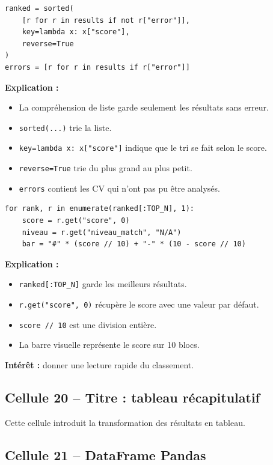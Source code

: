 \documentclass[12pt,a4paper]{article}
\begin{document}
\begin{lstlisting}[style=pythonstyle]
ranked = sorted(
    [r for r in results if not r["error"]],
    key=lambda x: x["score"],
    reverse=True
)
errors = [r for r in results if r["error"]]
\end{lstlisting}

\textbf{Explication :}
\begin{itemize}
  \item La compréhension de liste garde seulement les résultats sans erreur.
  \item \texttt{sorted(...)} trie la liste.
  \item \texttt{key=lambda x: x["score"]} indique que le tri se fait selon le score.
  \item \texttt{reverse=True} trie du plus grand au plus petit.
  \item \texttt{errors} contient les CV qui n'ont pas pu être analysés.
\end{itemize}

\begin{lstlisting}[style=pythonstyle]
for rank, r in enumerate(ranked[:TOP_N], 1):
    score = r.get("score", 0)
    niveau = r.get("niveau_match", "N/A")
    bar = "#" * (score // 10) + "-" * (10 - score // 10)
\end{lstlisting}

\textbf{Explication :}
\begin{itemize}
  \item \texttt{ranked[:TOP\_N]} garde les meilleurs résultats.
  \item \texttt{r.get("score", 0)} récupère le score avec une valeur par défaut.
  \item \texttt{score // 10} est une division entière.
  \item La barre visuelle représente le score sur 10 blocs.
\end{itemize}

\textbf{Intérêt :} donner une lecture rapide du classement.

\subsection{Cellule 20 -- Titre : tableau récapitulatif}

Cette cellule introduit la transformation des résultats en tableau.

\subsection{Cellule 21 -- DataFrame Pandas}
\end{document}
